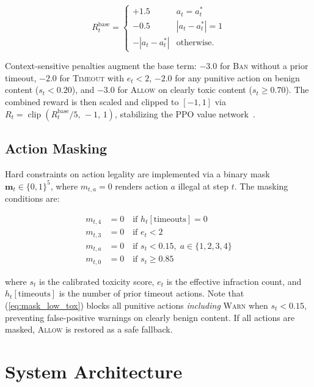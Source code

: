 \documentclass[journal]{IEEEtran}
\begin{document}
\begin{equation}\label{eq:base_reward}
  R^{\text{base}}_t =
  \begin{cases}
    +1.5 & a_t = a^*_t \\
    -0.5 & |a_t - a^*_t| = 1 \\
    -|a_t - a^*_t| & \text{otherwise.}
  \end{cases}
\end{equation}

Context-sensitive penalties augment the base term: $-3.0$ for \textsc{Ban} without a
prior timeout, $-2.0$ for \textsc{Timeout} with $e_t < 2$, $-2.0$ for any punitive action
on benign content ($s_t < 0.20$), and $-3.0$ for \textsc{Allow} on clearly toxic content
($s_t \geq 0.70$). The combined reward is then scaled and clipped to $[-1,1]$ via
$R_t = \operatorname{clip}(R^{\text{base}}_t/5,\, -1,\, 1)$, stabilizing the PPO value
network~\cite{schulman2017ppo}.

\subsection{Action Masking}

Hard constraints on action legality are implemented via a binary mask
$\mathbf{m}_t \in \{0,1\}^5$, where $m_{t,a} = 0$ renders action $a$ illegal at
step $t$. The masking conditions are:

\begin{align}
  m_{t,4} &= 0 \quad \text{if } h_t[\text{timeouts}] = 0 \label{eq:mask_ban}\\
  m_{t,3} &= 0 \quad \text{if } e_t < 2 \label{eq:mask_timeout}\\
  m_{t,a} &= 0 \quad \text{if } s_t < 0.15,\; a \in \{1,2,3,4\} \label{eq:mask_low_tox}\\
  m_{t,0} &= 0 \quad \text{if } s_t \geq 0.85 \label{eq:mask_high_tox}
\end{align}

where $s_t$ is the calibrated toxicity score, $e_t$ is the effective infraction count,
and $h_t[\text{timeouts}]$ is the number of prior timeout actions. Note that
(\ref{eq:mask_low_tox}) blocks all punitive actions \emph{including} \textsc{Warn} when
$s_t < 0.15$, preventing false-positive warnings on clearly benign content. If all actions
are masked, \textsc{Allow} is restored as a safe fallback.


\section{System Architecture}
\label{sec:architecture}
\end{document}
